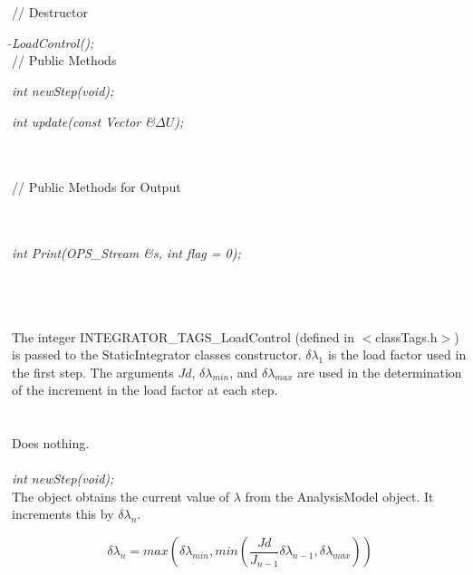 \\ \\
// Destructor 

{\em $\tilde{ }$LoadControl();}\\  

// Public Methods 

{\em int newStep(void);} 

{\em int update(const Vector \&$\Delta U$);} 

 \\ \\
// Public Methods for Output

\\ 
\\ 
{\em int Print(OPS_Stream \&s, int flag = 0);}


 \\
\\ \\
The integer INTEGRATOR\_TAGS\_LoadControl (defined in
$<$classTags.h$>$) is passed to the StaticIntegrator classes
constructor. $\delta \lambda_1$ is the load factor used in the first
step. The arguments $Jd$, $\delta \lambda_{min}$, and $\delta
\lambda_{max}$ are used in the determination of the increment in the
load factor at each step. \\



 \\
\\ 
Does nothing. \\

\\

{\em int newStep(void);} \\
The object obtains the current value of $\lambda$ from the AnalysisModel
object. It increments this by $\delta \lambda_n $.

\[ 
\delta \lambda_n = max \left( \delta \lambda_{min}, min \left(
\frac{Jd}{J_{n-1}} \delta \lambda_{n-1}, \delta \lambda_{max} \right) \right)
\]

